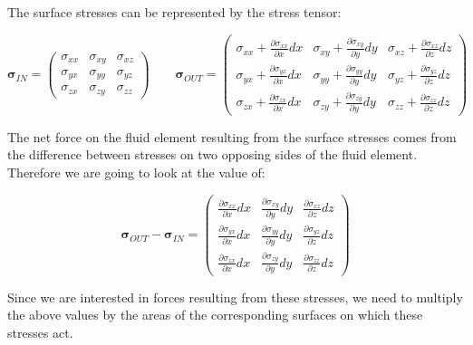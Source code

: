 The surface stresses can be represented by the stress tensor:

\begin{equation}
\bm{\sigma}_{IN} = \left(
\begin{matrix} 
\sigma_{xx} & \sigma_{xy} & \sigma_{xz} \\
\sigma_{yx} & \sigma_{yy} & \sigma_{yz} \\
\sigma_{zx} & \sigma_{zy} & \sigma_{zz}
\end{matrix}
\right)
\,\,\,\,\,\,\,\,\,\,\,\,
\bm{\sigma}_{OUT} = \left(
\begin{matrix} 
\sigma_{xx} + \frac{\partial \sigma_{xx}}{\partial x}dx & \sigma_{xy} + \frac{\partial \sigma_{xy}}{\partial y}dy & \sigma_{xz} + \frac{\partial \sigma_{xz}}{\partial z}dz \\
\sigma_{yx} + \frac{\partial \sigma_{yx}}{\partial x}dx & \sigma_{yy} + \frac{\partial \sigma_{yy}}{\partial y}dy & \sigma_{yz} + \frac{\partial \sigma_{yz}}{\partial z}dz \\
\sigma_{zx} + \frac{\partial \sigma_{zx}}{\partial x}dx & \sigma_{zy} + \frac{\partial \sigma_{zy}}{\partial y}dy & \sigma_{zz} + \frac{\partial \sigma_{zz}}{\partial z}dz 
\end{matrix}
\right)
\end{equation}

The net force on the fluid element resulting from the surface stresses comes from the difference between stresses on two opposing sides of the fluid element. Therefore we are going to look at the value of:

\begin{equation}
\bm{\sigma}_{OUT} - \bm{\sigma}_{IN} = \left(
\begin{matrix} 
 \frac{\partial \sigma_{xx}}{\partial x}dx & \frac{\partial \sigma_{xy}}{\partial y}dy & \frac{\partial \sigma_{xz}}{\partial z}dz \\
\frac{\partial \sigma_{yx}}{\partial x}dx & \frac{\partial \sigma_{yy}}{\partial y}dy & \frac{\partial \sigma_{yz}}{\partial z}dz \\
\frac{\partial \sigma_{zx}}{\partial x}dx & \frac{\partial \sigma_{zy}}{\partial y}dy & \frac{\partial \sigma_{zz}}{\partial z}dz 
\end{matrix}
\right)
\end{equation}

Since we are interested in forces resulting from these stresses, we need to multiply the above values by the areas of the corresponding surfaces on which these stresses act.


